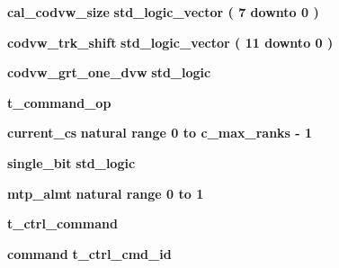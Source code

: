 \begin{DoxyCompactItemize}
\item 
{\bf cal\+\_\+codvw\+\_\+size} {\bfseries {\bfseries \textcolor{comment}{std\+\_\+logic\+\_\+vector}\textcolor{vhdlchar}{ }\textcolor{vhdlchar}{(}\textcolor{vhdlchar}{ }\textcolor{vhdlchar}{ } \textcolor{vhdldigit}{7} \textcolor{vhdlchar}{ }\textcolor{keywordflow}{downto}\textcolor{vhdlchar}{ }\textcolor{vhdlchar}{ } \textcolor{vhdldigit}{0} \textcolor{vhdlchar}{ }\textcolor{vhdlchar}{)}\textcolor{vhdlchar}{ }}} 
\item 
{\bf codvw\+\_\+trk\+\_\+shift} {\bfseries {\bfseries \textcolor{comment}{std\+\_\+logic\+\_\+vector}\textcolor{vhdlchar}{ }\textcolor{vhdlchar}{(}\textcolor{vhdlchar}{ }\textcolor{vhdlchar}{ } \textcolor{vhdldigit}{11} \textcolor{vhdlchar}{ }\textcolor{keywordflow}{downto}\textcolor{vhdlchar}{ }\textcolor{vhdlchar}{ } \textcolor{vhdldigit}{0} \textcolor{vhdlchar}{ }\textcolor{vhdlchar}{)}\textcolor{vhdlchar}{ }}} 
\item 
{\bf codvw\+\_\+grt\+\_\+one\+\_\+dvw} {\bfseries {\bfseries \textcolor{comment}{std\+\_\+logic}\textcolor{vhdlchar}{ }}} 
\item 
{\bf t\+\_\+command\+\_\+op} {\bfseries  }
\item 
{\bf current\+\_\+cs} {\bfseries {\bfseries \textcolor{comment}{natural}\textcolor{vhdlchar}{ }\textcolor{vhdlchar}{ }\textcolor{vhdlchar}{ }\textcolor{keywordflow}{range}\textcolor{vhdlchar}{ }\textcolor{vhdlchar}{ } \textcolor{vhdldigit}{0} \textcolor{vhdlchar}{ }\textcolor{keywordflow}{to}\textcolor{vhdlchar}{ }\textcolor{vhdlchar}{ }\textcolor{vhdlchar}{ }\textcolor{vhdlchar}{ }{\bfseries {\bf c\+\_\+max\+\_\+ranks}} \textcolor{vhdlchar}{-\/}\textcolor{vhdlchar}{ } \textcolor{vhdldigit}{1} \textcolor{vhdlchar}{ }}} 
\item 
{\bf single\+\_\+bit} {\bfseries {\bfseries \textcolor{comment}{std\+\_\+logic}\textcolor{vhdlchar}{ }}} 
\item 
{\bf mtp\+\_\+almt} {\bfseries {\bfseries \textcolor{comment}{natural}\textcolor{vhdlchar}{ }\textcolor{vhdlchar}{ }\textcolor{vhdlchar}{ }\textcolor{keywordflow}{range}\textcolor{vhdlchar}{ }\textcolor{vhdlchar}{ } \textcolor{vhdldigit}{0} \textcolor{vhdlchar}{ }\textcolor{keywordflow}{to}\textcolor{vhdlchar}{ }\textcolor{vhdlchar}{ } \textcolor{vhdldigit}{1} \textcolor{vhdlchar}{ }}} 
\item 
{\bf t\+\_\+ctrl\+\_\+command} {\bfseries  }
\item 
{\bf command} {\bfseries {\bfseries {\bfseries {\bf t\+\_\+ctrl\+\_\+cmd\+\_\+id}} \textcolor{vhdlchar}{ }}} 

\end{DoxyCompactItemize}

